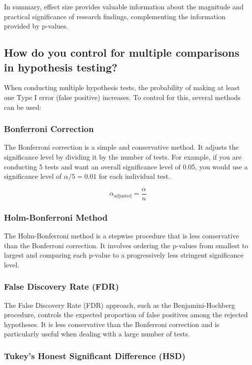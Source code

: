 \documentclass[12pt]{article}
\begin{document}
In summary, effect size provides valuable information about the magnitude and practical significance of research findings, complementing the information provided by p-values.

\subsection{How do you control for multiple comparisons in hypothesis testing?}

When conducting multiple hypothesis tests, the probability of making at least one Type I error (false positive) increases. To control for this, several methods can be used:

\subsubsection{Bonferroni Correction}

The Bonferroni correction is a simple and conservative method. It adjusts the significance level by dividing it by the number of tests. For example, if you are conducting 5 tests and want an overall significance level of 0.05, you would use a significance level of \( \alpha / 5 = 0.01 \) for each individual test.

\[
\alpha_{\text{adjusted}} = \frac{\alpha}{n}
\]

\subsubsection{Holm-Bonferroni Method}

The Holm-Bonferroni method is a stepwise procedure that is less conservative than the Bonferroni correction. It involves ordering the p-values from smallest to largest and comparing each p-value to a progressively less stringent significance level.

\subsubsection{False Discovery Rate (FDR)}

The False Discovery Rate (FDR) approach, such as the Benjamini-Hochberg procedure, controls the expected proportion of false positives among the rejected hypotheses. It is less conservative than the Bonferroni correction and is particularly useful when dealing with a large number of tests.

\subsubsection{Tukey's Honest Significant Difference (HSD)}
\end{document}

